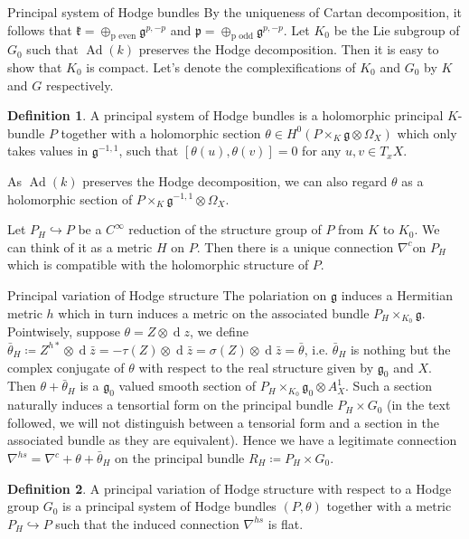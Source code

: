 \documentclass[aspectratio=169, 10pt]{beamer}
\theoremstyle{definition}
\newtheorem{Def}{Definition}
\theoremstyle{example}
\begin{document}
	\begin{frame}{Principal system of Hodge bundles}
		By the uniqueness of Cartan decomposition, it follows that $\mathfrak{k}=\oplus_{\text{p even}}\mathfrak{g}^{p,-p}$ and $\mathfrak{p}=\oplus_{\text{p odd}}\mathfrak{g}^{p,-p}$. Let $K_0$ be the Lie subgroup of $G_0$ such that $\operatorname{Ad}(k)$ preserves the Hodge decomposition. Then it is easy to show that $K_0$ is compact. Let's denote the complexifications of $K_0$ and $G_0$ by $K$ and $G$ respectively. 
		\begin{Def}
			A principal system of Hodge bundles is a holomorphic principal $K$-bundle $P$ together with a holomorphic section $\theta\in H^{0}(P\times_K \mathfrak{g}\otimes \Omega_X)$ which only takes values in $\mathfrak{g}^{-1,1}$, such that $[\theta(u),\theta(v)]=0$ for any $u,v\in T_xX$. 
		\end{Def}  
		As $\operatorname{Ad}(k)$ preserves the Hodge decomposition, we can also regard $\theta$ as a holomorphic section of $P\times_K \mathfrak{g}^{-1,1}\otimes \Omega_X$.

		Let $P_{H}\hookrightarrow P$ be a $C^{\infty}$ reduction of the structure group of $P$ from $K$ to $K_0$. We can think of it as a metric $H$ on $P$. Then there is a unique connection $\nabla^{c}$on $P_H$ which is compatible with the holomorphic structure of $P$.
	\end{frame}
	\begin{frame}{Principal variation of Hodge structure}
		The polariation on $\mathfrak{g}$ induces a Hermitian metric $h$ which in turn induces a metric on the associated bundle $P_H\times_{K_0} \mathfrak{g}$. Pointwisely, suppose $\theta=Z\otimes \operatorname{d}z$, we define $\bar{\theta}_H\coloneqq Z^{h*}\otimes \operatorname{d}\bar{z}=-\tau(Z)\otimes \operatorname{d}\bar{z}=\sigma(Z)\otimes \operatorname{d}\bar{z}=\bar{\theta}$, i.e. $\bar{\theta}_H$ is nothing but the complex conjugate of $\theta$ with respect to the real structure given by $\mathfrak{g}_0$ and $X$. Then $\theta+\bar{\theta}_H$ is a $\mathfrak{g}_0$ valued smooth section of $P_H\times_{K_0} \mathfrak{g}_0\otimes A_X^1$. Such a section naturally induces a tensortial form on the principal bundle $P_H\times G_0$ (in the text followed, we will not distinguish between a tensorial form and a section in the associated bundle as they are equivalent). Hence we have a legitimate connection $\nabla^{hs}=\nabla^{c}+\theta+\bar{\theta}_H$ on the principal bundle $R_H\coloneqq P_H\times G_0$. 
		\begin{Def}
			A principal variation of Hodge structure with respect to a Hodge group $G_0$ is a principal system of Hodge bundles $(P,\theta)$ together with a metric $P_H\hookrightarrow P$ such that the induced connection $\nabla^{hs}$ is flat.
		\end{Def}
	\end{frame}
\end{document}
